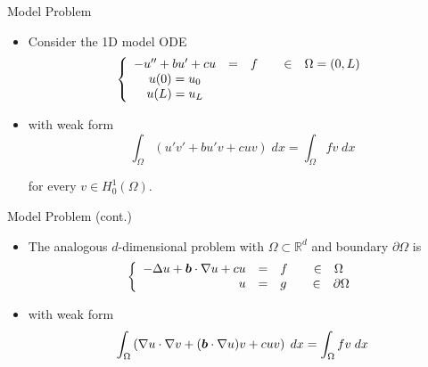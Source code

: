 \begin{frame}{Model Problem}
\begin{itemize}
  \item Consider the 1D model ODE
    \begin{equation}
      \left\{
	\begin{array}{ccc}
	  -u'' + bu' +cu &=& f \hspace{.25in} \in \hspace{.1in} \Omega = (0,L) \\
	  u(0) =  u_0   && \\
	  u(L) =  u_L	&&
	\end{array}
	\right.
    \end{equation}

  \item with weak form
    \begin{equation}
      \int_{\Omega} \left( u' v' + b u' v + cuv \right) \; dx = \int_{\Omega} fv \; dx
    \end{equation}

    for every $v \in H^1_0 (\Omega)$.
\end{itemize}
\end{frame}


\begin{frame}{Model Problem (cont.)}
\begin{itemize}
\item The analogous $d$-dimensional problem with $\Omega \subset \mathbb{R}^d$
  and boundary $\partial \Omega$ is
    \begin{equation}
      \left\{
	\begin{array}{ccl}
	  -\Delta u + \bv{b} \cdot \nabla u + cu &=& f
	  \hspace{.25in} \in \hspace{.1in} \Omega  \\
	  \phantom{-\Delta u + \bv{b} \cdot \nabla u + c}u & = & g
	  \hspace{.25in} \in \hspace{.1in} \partial \Omega
	\end{array}
	\right.
    \end{equation}

  \item with weak form
    \begin{equation}
      \int_{\Omega} \left( \nabla u \cdot \nabla v + ({\boldsymbol{b}} \cdot \nabla u) v + cuv \right) \; dx = \int_{\Omega} fv \; dx
    \end{equation}

\end{itemize}

\end{frame}


